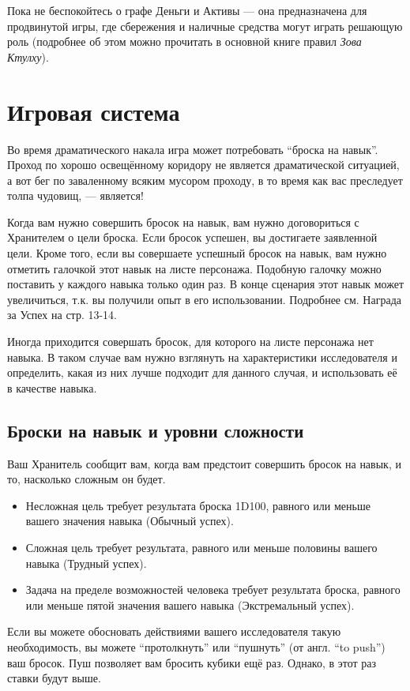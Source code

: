 \documentclass[letterpaper,twocolumn,openany, twoside, 11pt, usenames]{cocbook}
\begin{document}
Пока не беспокойтесь о графе Деньги и Активы --- она предназначена для продвинутой игры, где сбережения и наличные средства могут играть решающую роль (подробнее об этом можно прочитать в основной книге правил {\it Зова Ктулху}).

\section*{Игровая система}

Во время драматического накала игра может потребовать ``броска на навык''. Проход по хорошо освещённому коридору не является драматической ситуацией, а вот бег по заваленному всяким мусором проходу, в то время как вас преследует толпа чудовищ, --- является!

Когда вам нужно совершить бросок на навык, вам нужно договориться с Хранителем о цели броска. Если бросок успешен, вы достигаете заявленной цели. Кроме того, если вы совершаете успешный бросок на навык, вам нужно отметить галочкой этот навык на листе персонажа. Подобную галочку можно поставить у каждого навыка только один раз. В конце сценария этот навык может увеличиться, т.к. вы получили опыт в его использовании. Подробнее см. Награда за Успех на стр. 13-14.

Иногда приходится совершать бросок, для которого на листе персонажа нет навыка. В таком случае вам нужно взглянуть на характеристики исследователя и определить, какая из них лучше подходит для данного случая, и использовать её в качестве навыка.

\subsection*{Броски на навык и уровни сложности}

Ваш Хранитель сообщит вам, когда вам предстоит совершить бросок на навык, и то, насколько сложным он будет.
\smallbreak
\begin{itemize}[leftmargin=4mm]
  \item Несложная цель требует результата броска 1D100, равного или меньше вашего значения навыка (Обычный успех).
  \item Сложная цель требует результата, равного или меньше половины вашего навыка (Трудный успех).
  \item Задача на пределе возможностей человека требует результата броска, равного или меньше пятой значения вашего навыка (Экстремальный успех).
\end{itemize}
\smallbreak
Если вы можете обосновать действиями вашего исследователя такую необходимость, вы можете ``протолкнуть'' или ``пушнуть'' (от англ. ``to push'') ваш бросок. Пуш позволяет вам бросить кубики ещё раз. Однако, в этот раз ставки будут выше.
\end{document}
